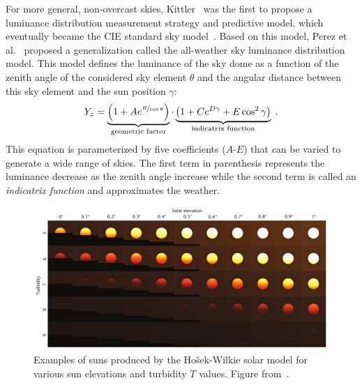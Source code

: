 For more general, non-overcast skies, Kittler~\cite{kittler1985luminance} was the first to propose a luminance distribution measurement strategy and predictive model, which eventually became the CIE standard sky model~\cite{darula-cie-sky}. Based on this model, Perez et al.~\cite{perez1993allweather} proposed a generalization called the all-weather sky luminance distribution model. This model defines the luminance of the sky dome as a function of the zenith angle of the considered sky element $\theta$ and the angular distance between this sky element and the sun position $\gamma$:
\begin{equation}
Y_z = \underbrace{\left( 1 + A e^{\nicefrac{B}{\cos\theta}} \right)}_{\text{geometric factor}} \cdot \underbrace{\left( 1 + C e^{D\gamma} + E \cos^2 \gamma \right)}_{\text{indicatrix function}} \;.
\label{eq:perez}
\end{equation}
This equation is parameterized by five coefficients ($A$-$E$) that can be varied to generate a wide range of skies. The first term in parenthesis represents the luminance decrease as the zenith angle increase while the second term is called an \emph{indicatrix function} and approximates the weather.


\begin{figure}
\centering
\includegraphics[width=0.96\linewidth]{3rdparty/hwsun-suns.png}
\caption[Examples of suns produced by the Ho\v{s}ek-Wilkie solar model]{Examples of suns produced by the Ho\v{s}ek-Wilkie solar model for various sun elevations and turbidity $T$ values. Figure from~\cite{hosek-siggraph-12}.}
\label{fig:hw_sun_model}
\end{figure}

